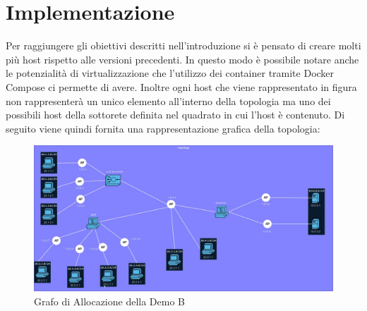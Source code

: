 \section{Implementazione}
Per raggiungere gli obiettivi descritti nell'introduzione si è pensato di creare molti più host rispetto alle versioni precedenti. In questo modo è possibile notare anche le potenzialità di virtualizzazione che l'utilizzo dei container tramite Docker Compose ci permette di avere.
Inoltre ogni host che viene rappresentato in figura non rappresenterà un unico elemento all'interno della topologia ma uno dei possibili host della sottorete definita nel quadrato in cui l'host è contenuto. Di seguito viene quindi fornita una rappresentazione grafica della topologia: 
\begin{figure}[h]  %
    \centering
    \includegraphics[width=1\textwidth]{Allocation_Graph.jpg} 
    \caption{Grafo di Allocazione della Demo B}
    \label{fig:AllocationGraphB}
\end{figure}

